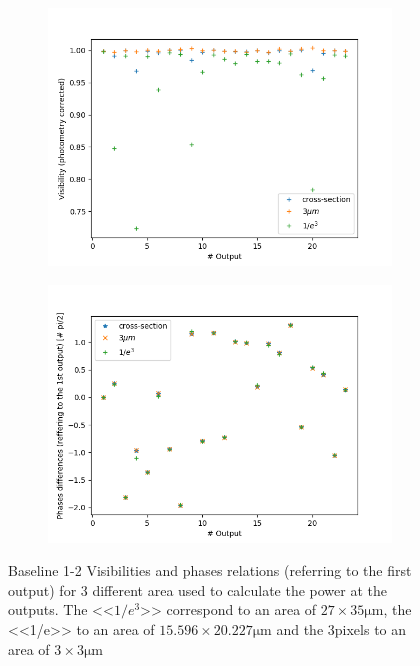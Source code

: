 \begin{figure}[htbp]
  \centering
  \begin{subfigure}[b]{.45\textwidth}
    \centering
    \includegraphics[scale=.4]{picture/geometry/visi_flat_3area.png}
    \caption{}
\end{subfigure}%
\hspace{.5cm}
\begin{subfigure}[b]{.45\textwidth}
  \centering
  \includegraphics[scale=.4]{picture/geometry/phases_flat_3area.png}
  \caption{}
  \end{subfigure}
  \caption{Baseline 1-2 Visibilities and phases relations
    (referring to the first output) for 3 different area used to
    calculate the power at the outputs. The <<$1/e^3$>> correspond to
    an area of $27\times 35\si{\micro\meter}$, the <<1/e>> to an area of
    $15.596\times20.227\si{\micro\meter}$ and the 3pixels to an area
    of $3\times 3\si{\micro\meter}$}
  \label{fig:visi_phases_area}
 
\end{figure}

